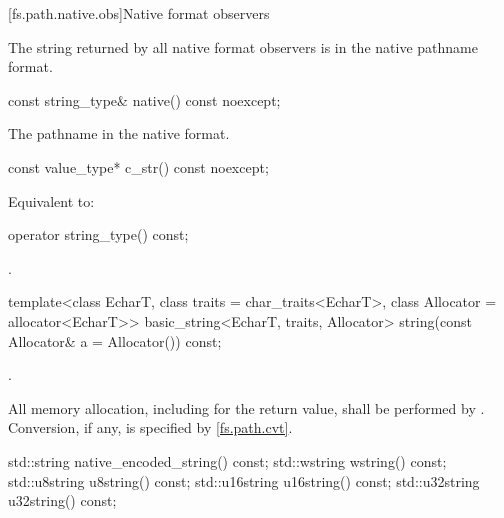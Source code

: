 [fs.path.native.obs]{Native format observers}

\pnum
The string returned by all native format observers is in the native pathname format.

%
\begin{itemdecl}
const string_type& native() const noexcept;
\end{itemdecl}

\begin{itemdescr}
\pnum
\returns
The pathname in the native format.
\end{itemdescr}

%
\begin{itemdecl}
const value_type* c_str() const noexcept;
\end{itemdecl}

\begin{itemdescr}
\pnum
\effects
Equivalent to: 
\end{itemdescr}

%
\begin{itemdecl}
operator string_type() const;
\end{itemdecl}

\begin{itemdescr}
\pnum
\returns
{}.
\end{itemdescr}

%
\begin{itemdecl}
template<class EcharT, class traits = char_traits<EcharT>, class Allocator = allocator<EcharT>>
  basic_string<EcharT, traits, Allocator> string(const Allocator& a = Allocator()) const;
\end{itemdecl}

\begin{itemdescr}
\pnum
\returns
{}.

\pnum
\remarks
All memory allocation, including for the return value, shall
be performed by . Conversion, if any, is specified by
\ref{fs.path.cvt}.
\end{itemdescr}

%
%
%
%
%
\begin{itemdecl}
std::string native_encoded_string() const;
std::wstring wstring() const;
std::u8string u8string() const;
std::u16string u16string() const;
std::u32string u32string() const;
\end{itemdecl}

